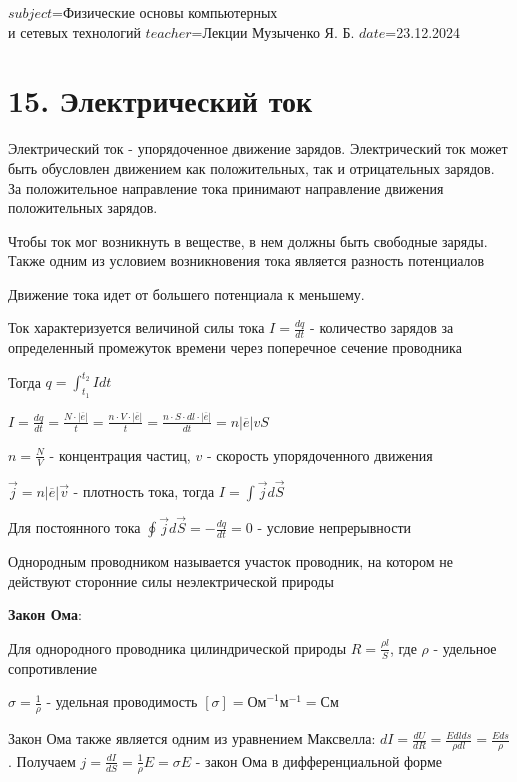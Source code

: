$subject$=Физические основы компьютерных \\ и сетевых технологий
$teacher$=Лекции Музыченко Я. Б.
$date$=23.12.2024

\section{15. Электрический ток}

\Def Электрический ток - упорядоченное движение зарядов. Электрический ток может быть обусловлен движением как положительных, так и отрицательных зарядов.
За положительное направление тока принимают направление движения положительных зарядов.

Чтобы ток мог возникнуть в веществе, в нем должны быть свободные заряды. Также одним из условием возникновения тока является разность потенциалов

Движение тока идет от большего потенциала к меньшему.

Ток характеризуется величиной силы тока $I = \frac{dq}{dt}$ - количество зарядов за определенный промежуток времени через поперечное сечение проводника

Тогда $q = \int_{t_1}^{t_2} Idt$

$I = \frac{dq}{dt} = \frac{N \cdot |\overline{e}|}{t} = \frac{n \cdot V \cdot |\overline{e}|}{t} = \frac{n \cdot S \cdot dl \cdot |\overline{e}|}{dt} = n |\overline{e}| v S$

$n = \frac{N}{V}$ - концентрация частиц, $v$ - скорость упорядоченного движения

$\vec{j} = n |\overline{e}| \vec{v}$ - плотность тока, тогда $I = \int \vec{j} d\vec{S}$

Для постоянного тока $\oint \vec{j} d\vec{S} = -\frac{dq}{dt} = 0$ - условие непрерывности

Однородным проводником называется участок проводник, на котором не действуют сторонние силы неэлектрической природы

\textbf{Закон Ома}: 

Для однородного проводника цилиндрической природы $R = \frac{\rho l}{S}$, где $\rho$ - удельное сопротивление

$\sigma = \frac{1}{\rho}$ - удельная проводимость \hfill $[\sigma] = \text{Ом}^{-1} \text{м}^{-1} = \text{См}$

Закон Ома также является одним из уравнением Максвелла: $dI = \frac{dU}{dR} = \frac{E dl ds}{\rho dl} = \frac{E ds}{\rho}$.
Получаем $j = \frac{dI}{dS} = \frac{1}{\rho} E = \sigma E$ - закон Ома в дифференциальной форме

